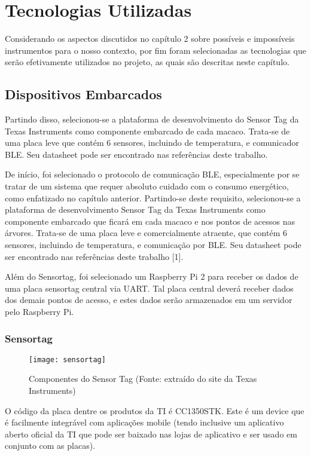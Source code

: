 \chapter{Tecnologias Utilizadas}
Considerando os aspectos discutidos no capítulo 2 sobre possíveis e impossíveis instrumentos para o nosso contexto, por fim foram selecionadas as tecnologias que serão efetivamente utilizados no projeto, as quais são descritas neste capítulo.

\section{Dispositivos Embarcados}
Partindo disso, selecionou-se a plataforma de desenvolvimento do Sensor Tag da Texas Instruments como componente embarcado de cada macaco. Trata-se de uma placa leve que contém 6 sensores, incluindo de temperatura, e comunicador BLE. Seu datasheet pode ser encontrado nas referências deste trabalho.

De início, foi selecionado o protocolo de comunicação BLE, especialmente por se tratar de um sistema que requer absoluto cuidado com o consumo energético, como enfatizado no capítulo anterior.
Partindo-se deste requisito, selecionou-se a plataforma de desenvolvimento Sensor Tag da Texas Instruments como componente embarcado que ficará em cada macaco e nos pontos de acessos nas árvores. Trata-se de uma placa leve e comercialmente atraente, que contém 6 sensores, incluindo de temperatura, e comunicação por BLE. Seu datasheet pode ser encontrado nas referências deste trabalho [1].

Além do Sensortag, foi selecionado um Raspberry Pi 2 para receber os dados de uma placa sensortag central via UART. Tal placa central deverá receber dados dos demais pontos de acesso, e estes dados serão armazenados em um servidor pelo Raspberry Pi.

\subsection{Sensortag}

\begin{figure}[ht]
  \centering
    \texttt{[image: sensortag]}
  \caption{Componentes do Sensor Tag (Fonte: extraído do site da Texas Instruments)}
\end{figure}

O código da placa dentre os produtos da TI é CC1350STK. Este é um device que é facilmente integrável com aplicações mobile (tendo inclusive um aplicativo aberto oficial da TI que pode ser baixado nas lojas de aplicativo e ser usado em conjunto com as placas).\\

